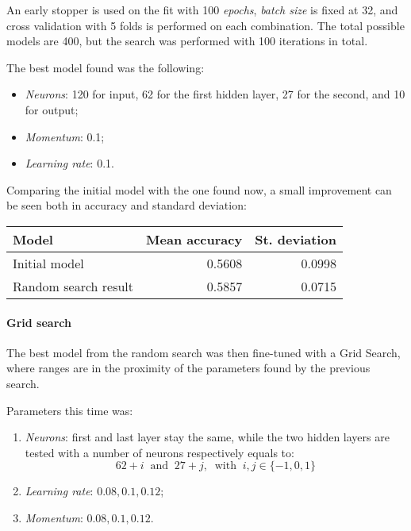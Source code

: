 An early stopper is used on the fit with 100 \emph{epochs}, \emph{batch size} 
is fixed at 
32, and cross validation with 5 folds is performed on each combination.
The total possible models are 400, but the search was performed with 100 iterations
in total.

The best model found was the following: 
\begin{itemize}
    \item \emph{Neurons}: 120 for input, 62 for the first hidden layer, 27 for the second, and 10 for output; 
    \item \emph{Momentum}: 0.1;
    \item \emph{Learning rate}: 0.1.
\end{itemize}
Comparing the initial model with the one found now, a small improvement 
can be seen both in accuracy and standard deviation:
\begin{center}
    \begin{tabular}{ |l|r|r| } 
        \hline
        Model & Mean accuracy & St. deviation \\
        \hline
        Initial model & 0.5608& 0.0998\\
        Random search result & 0.5857 & 0.0715 \\
        \hline
    \end{tabular}
\end{center}

\paragraph{Grid search}
The best model from the random search was then fine-tuned with a Grid Search, 
where ranges are in the proximity of the parameters found by the previous search.

Parameters this time was:
\begin{enumerate}
    \item \emph{Neurons}: first and last layer stay the same, while 
    the two hidden layers are tested with a number of neurons respectively 
    equals to: 
    $$62 + i\;\;\text{and}\;\;27 + j,\;\;\text{with}\;\; i, j \in \{-1,0,1\}$$
    \item \emph{Learning rate}: $0.08, 0.1, 0.12$;
    \item \emph{Momentum}: $0.08, 0.1, 0.12$.
\end{enumerate}

